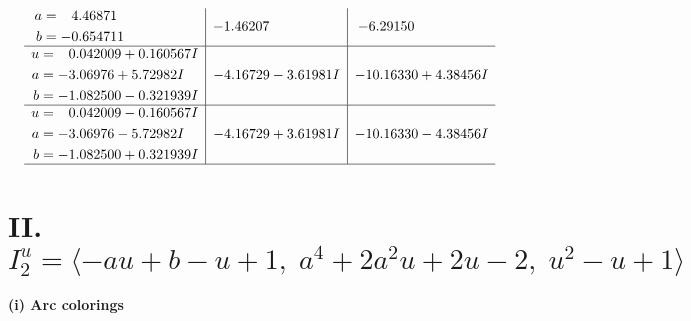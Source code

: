 \documentclass[1p]{elsarticle_modified}
\theoremstyle{definition}
\begin{document}
$$\begin{array}{c|c|c}
\begin{aligned}
a &= \phantom{-}4.46871\phantom{ +0.000000I} \\
b &= -0.654711\phantom{ +0.000000I}\end{aligned}
 & -1.46207\phantom{ +0.000000I} & -6.29150\phantom{ +0.000000I} \\ \hline\begin{aligned}
u &= \phantom{-}0.042009 + 0.160567 I \\
a &= -3.06976 + 5.72982 I \\
b &= -1.082500 - 0.321939 I\end{aligned}
 & -4.16729 - 3.61981 I & -10.16330 + 4.38456 I \\ \hline\begin{aligned}
u &= \phantom{-}0.042009 - 0.160567 I \\
a &= -3.06976 - 5.72982 I \\
b &= -1.082500 + 0.321939 I\end{aligned}
 & -4.16729 + 3.61981 I & -10.16330 - 4.38456 I\\
 \hline 
 \end{array}$$\newpage\newpage\renewcommand{\arraystretch}{1}
\centering \section*{II. $I^u_{2}= \langle - a u+b- u+1,\;a^4+2 a^2 u+2 u-2,\;u^2- u+1 \rangle$}
\flushleft \textbf{(i) Arc colorings}\\
\end{document}
